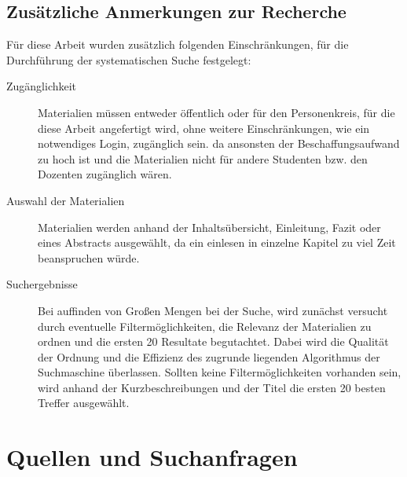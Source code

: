 \subsection{Zusätzliche Anmerkungen zur Recherche}
\label{subsec:zusätzlicheAnmerkungenZurRecherce}
Für diese Arbeit wurden zusätzlich folgenden Einschränkungen, für die Durchführung der systematischen Suche festgelegt:

\begin{description}
	\item[Zugänglichkeit] Materialien müssen entweder öffentlich oder für den Personenkreis, für die diese Arbeit angefertigt wird, ohne weitere Einschränkungen, wie ein notwendiges Login, zugänglich sein. da ansonsten der Beschaffungsaufwand zu hoch ist und die Materialien nicht für andere Studenten bzw. den Dozenten zugänglich wären.
	\item[Auswahl der Materialien] Materialien werden anhand der Inhaltsübersicht, Einleitung, Fazit oder eines Abstracts ausgewählt, da ein einlesen in einzelne Kapitel zu viel Zeit beanspruchen würde.
	\item[Suchergebnisse] Bei auffinden von Großen Mengen bei der Suche, wird zunächst versucht durch eventuelle Filtermöglichkeiten, die Relevanz der Materialien zu ordnen und die ersten 20 Resultate begutachtet. Dabei wird die Qualität der Ordnung und die Effizienz des zugrunde liegenden Algorithmus der Suchmaschine überlassen. Sollten keine Filtermöglichkeiten vorhanden sein, wird anhand der Kurzbeschreibungen und der Titel die ersten 20 besten Treffer ausgewählt.
\end{description}

\section{Quellen und Suchanfragen}
\label{sec:QuellenUndSuchanfragen}


